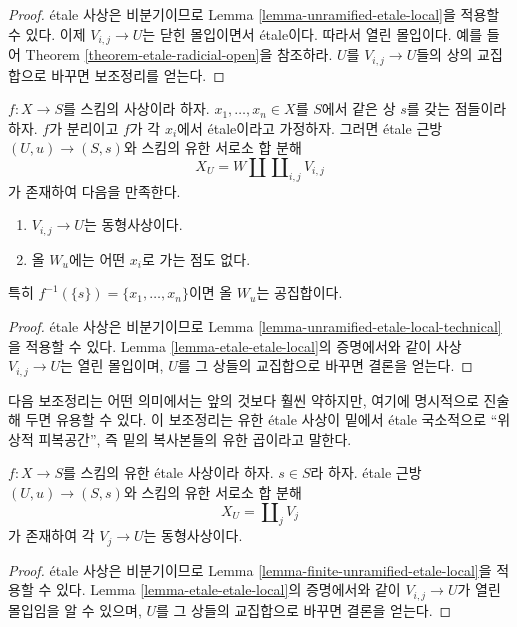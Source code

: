 \begin{proof}
\'etale 사상은 비분기이므로 Lemma
\ref{lemma-unramified-etale-local}을 적용할 수 있다.
이제 $V_{i, j} \to U$는 닫힌 몰입이면서 \'etale이다.
따라서 열린 몰입이다. 예를 들어 Theorem
\ref{theorem-etale-radicial-open}을 참조하라.
$U$를 $V_{i, j} \to U$들의 상의 교집합으로 바꾸면 보조정리를 얻는다.
\end{proof}

\begin{lemma}
\label{lemma-etale-etale-local-technical}
$f : X \to S$를 스킴의 사상이라 하자.
$x_1, \ldots, x_n \in X$를 $S$에서 같은 상 $s$를 갖는 점들이라 하자.
$f$가 분리이고 $f$가 각 $x_i$에서 \'etale이라고 가정하자.
그러면 \'etale 근방 $(U, u) \to (S, s)$와 스킴의 유한 서로소 합 분해
$$
X_U =
W \amalg \coprod\nolimits_{i, j} V_{i, j}
$$
가 존재하여 다음을 만족한다.
\begin{enumerate}
\item $V_{i, j} \to U$는 동형사상이다.
\item 올 $W_u$에는 어떤 $x_i$로 가는 점도 없다.
\end{enumerate}
특히 $f^{-1}(\{s\}) = \{x_1, \ldots, x_n\}$이면 올 $W_u$는 공집합이다.
\end{lemma}

\begin{proof}
\'etale 사상은 비분기이므로 Lemma
\ref{lemma-unramified-etale-local-technical}을 적용할 수 있다.
Lemma \ref{lemma-etale-etale-local}의 증명에서와 같이
사상 $V_{i, j} \to U$는 열린 몰입이며,
$U$를 그 상들의 교집합으로 바꾸면 결론을 얻는다.
\end{proof}

\noindent
다음 보조정리는 어떤 의미에서는 앞의 것보다 훨씬 약하지만,
여기에 명시적으로 진술해 두면 유용할 수 있다. 이 보조정리는
유한 \'etale 사상이 밑에서 \'etale 국소적으로 “위상적 피복공간”,
즉 밑의 복사본들의 유한 곱이라고 말한다.

\begin{lemma}
\label{lemma-finite-etale-etale-local}
$f : X \to S$를 스킴의 유한 \'etale 사상이라 하자.
$s \in S$라 하자. \'etale 근방 $(U, u) \to (S, s)$와
스킴의 유한 서로소 합 분해
$$
X_U = \coprod\nolimits_j V_j
$$
가 존재하여 각 $V_j \to U$는 동형사상이다.
\end{lemma}

\begin{proof}
\'etale 사상은 비분기이므로 Lemma
\ref{lemma-finite-unramified-etale-local}을 적용할 수 있다.
Lemma \ref{lemma-etale-etale-local}의 증명에서와 같이
$V_{i, j} \to U$가 열린 몰입임을 알 수 있으며,
$U$를 그 상들의 교집합으로 바꾸면 결론을 얻는다.
\end{proof}





